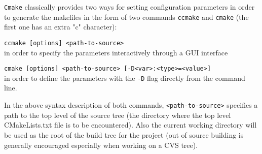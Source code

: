 \verb+Cmake+ classically provides two ways for setting configuration
parameters in order to generate the makefiles in the form of two
commands \verb+ccmake+ and \verb+cmake+ (the first one has an extra
"c" character):
\begin{description}
\item{\verb+ccmake [options] <path-to-source>+}\\ in order to specify
  the parameters interactively through a GUI interface
\item{\verb+cmake [options] <path-to-source> [-D<var>:<type>=<value>]+}\\ in
  order to define the parameters with the \verb+-D+ flag directly from
  the command line.
\end{description}
In the above syntax description of both commands, {\verb+<path-to-source>+}
specifies a path to the top level of the source tree (\ie the directory where
the top level CMakeLists.txt file is to be encountered). Also the current
working directory will be used as the root of the build tree for the project
(out of source building is generally encouraged especially when working on a
CVS tree).

